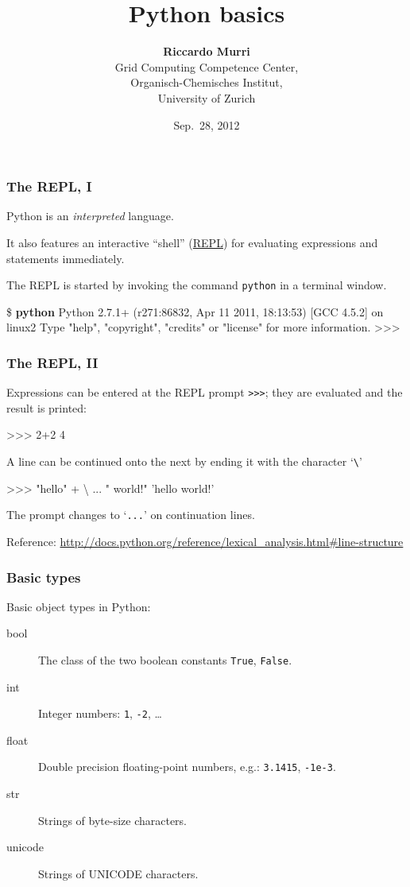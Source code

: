 \documentclass[english,serif,mathserif,xcolor=pdftex,dvipsnames,table]{beamer}
\title{%
  Python basics
}
\author[R. Murri]{%
  \textbf{Riccardo Murri} \\
  Grid Computing Competence Center, \\
  Organisch-Chemisches Institut, \\
  University of Zurich
}
\date{Sep.~28, 2012}
\begin{document}
\maketitle


\begin{frame}[fragile]
  \frametitle{The REPL, I}
  Python is an \emph{interpreted} language.

  \+
  It also features an interactive ``shell''
  (\href{http://en.wikipedia.org/wiki/REPL}{REPL}) for evaluating
  expressions and statements immediately.

  \+
  The REPL is started by invoking the command \texttt{python} in a
  terminal window.
\begin{semiverbatim}\small
\$ \textbf{python}
Python 2.7.1+ (r271:86832, Apr 11 2011, 18:13:53) 
[GCC 4.5.2] on linux2
Type "help", "copyright", "credits" or "license" 
for more information.
>>> 
\end{semiverbatim}
\end{frame}

\begin{frame}[fragile]
  \frametitle{The REPL, II}
  Expressions can be entered at the REPL prompt \texttt{>>>}; they are
  evaluated and the result is printed:
\begin{semiverbatim}
>>> 2+2
4
\end{semiverbatim}

  \+
  A line can be continued onto the next by ending it with the
  character `\texttt{\textbackslash}'
\begin{semiverbatim}
>>> "hello" + \textbackslash
... " world!"
'hello world!'
\end{semiverbatim}
  The prompt changes to `\texttt{...}' on continuation lines.

  \+\scriptsize
  Reference:
  \url{http://docs.python.org/reference/lexical_analysis.html#line-structure}
\end{frame}


\begin{frame}
  \frametitle{Basic types}
  Basic object types in Python:
  \begin{description}
  \item[bool] The class of the two boolean constants \texttt{True}, \texttt{False}.
  \item[int] Integer numbers: \texttt{1}, \texttt{-2}, \ldots
  \item[float] Double precision floating-point numbers, e.g.:
    \texttt{3.1415}, \texttt{-1e-3}.
  \item[str] Strings of byte-size characters.
  \item[unicode] Strings of UNICODE characters.
  \end{description}
\end{frame}
\end{document}

